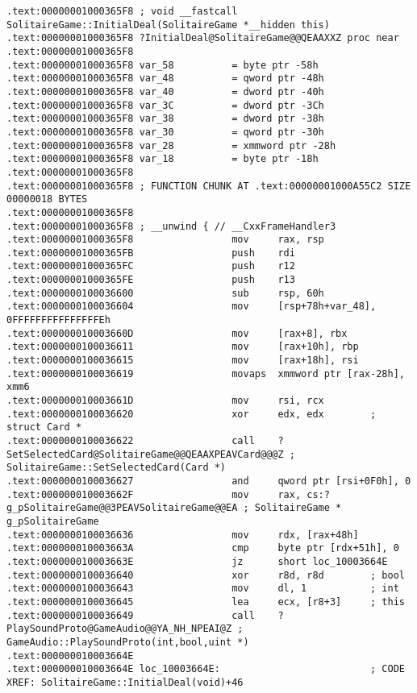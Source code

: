 \begin{lstlisting}
.text:00000001000365F8 ; void __fastcall SolitaireGame::InitialDeal(SolitaireGame *__hidden this)
.text:00000001000365F8 ?InitialDeal@SolitaireGame@@QEAAXXZ proc near
.text:00000001000365F8
.text:00000001000365F8 var_58          = byte ptr -58h
.text:00000001000365F8 var_48          = qword ptr -48h
.text:00000001000365F8 var_40          = dword ptr -40h
.text:00000001000365F8 var_3C          = dword ptr -3Ch
.text:00000001000365F8 var_38          = dword ptr -38h
.text:00000001000365F8 var_30          = qword ptr -30h
.text:00000001000365F8 var_28          = xmmword ptr -28h
.text:00000001000365F8 var_18          = byte ptr -18h
.text:00000001000365F8
.text:00000001000365F8 ; FUNCTION CHUNK AT .text:00000001000A55C2 SIZE 00000018 BYTES
.text:00000001000365F8
.text:00000001000365F8 ; __unwind { // __CxxFrameHandler3
.text:00000001000365F8                 mov     rax, rsp
.text:00000001000365FB                 push    rdi
.text:00000001000365FC                 push    r12
.text:00000001000365FE                 push    r13
.text:0000000100036600                 sub     rsp, 60h
.text:0000000100036604                 mov     [rsp+78h+var_48], 0FFFFFFFFFFFFFFFEh
.text:000000010003660D                 mov     [rax+8], rbx
.text:0000000100036611                 mov     [rax+10h], rbp
.text:0000000100036615                 mov     [rax+18h], rsi
.text:0000000100036619                 movaps  xmmword ptr [rax-28h], xmm6
.text:000000010003661D                 mov     rsi, rcx
.text:0000000100036620                 xor     edx, edx        ; struct Card *
.text:0000000100036622                 call    ?SetSelectedCard@SolitaireGame@@QEAAXPEAVCard@@@Z ; SolitaireGame::SetSelectedCard(Card *)
.text:0000000100036627                 and     qword ptr [rsi+0F0h], 0
.text:000000010003662F                 mov     rax, cs:?g_pSolitaireGame@@3PEAVSolitaireGame@@EA ; SolitaireGame * g_pSolitaireGame
.text:0000000100036636                 mov     rdx, [rax+48h]
.text:000000010003663A                 cmp     byte ptr [rdx+51h], 0
.text:000000010003663E                 jz      short loc_10003664E
.text:0000000100036640                 xor     r8d, r8d        ; bool
.text:0000000100036643                 mov     dl, 1           ; int
.text:0000000100036645                 lea     ecx, [r8+3]     ; this
.text:0000000100036649                 call    ?PlaySoundProto@GameAudio@@YA_NH_NPEAI@Z ; GameAudio::PlaySoundProto(int,bool,uint *)
.text:000000010003664E
.text:000000010003664E loc_10003664E:                          ; CODE XREF: SolitaireGame::InitialDeal(void)+46

\end{lstlisting}
